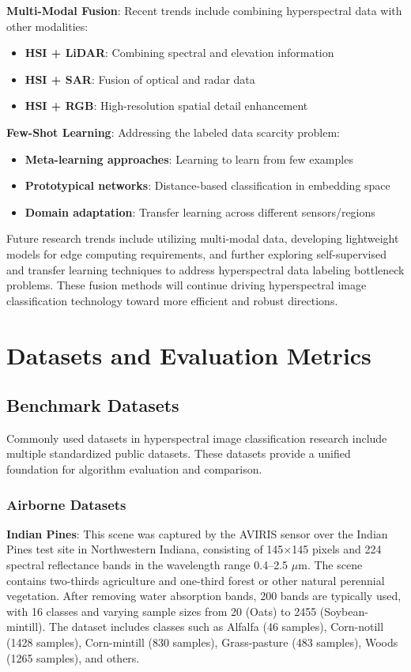 \documentclass[journal]{IEEEtran}
\begin{document}
\textbf{Multi-Modal Fusion}: Recent trends include combining hyperspectral data with other modalities:
\begin{itemize}
\item \textbf{HSI + LiDAR}: Combining spectral and elevation information
\item \textbf{HSI + SAR}: Fusion of optical and radar data
\item \textbf{HSI + RGB}: High-resolution spatial detail enhancement
\end{itemize}

\textbf{Few-Shot Learning}: Addressing the labeled data scarcity problem:
\begin{itemize}
\item \textbf{Meta-learning approaches}: Learning to learn from few examples
\item \textbf{Prototypical networks}: Distance-based classification in embedding space
\item \textbf{Domain adaptation}: Transfer learning across different sensors/regions
\end{itemize}

Future research trends include utilizing multi-modal data, developing lightweight models for edge computing requirements, and further exploring self-supervised and transfer learning techniques to address hyperspectral data labeling bottleneck problems. These fusion methods will continue driving hyperspectral image classification technology toward more efficient and robust directions.

\section{Datasets and Evaluation Metrics}

\subsection{Benchmark Datasets}

Commonly used datasets in hyperspectral image classification research include multiple standardized public datasets. These datasets provide a unified foundation for algorithm evaluation and comparison.

\subsubsection{Airborne Datasets}

\textbf{Indian Pines}: This scene was captured by the AVIRIS sensor over the Indian Pines test site in Northwestern Indiana, consisting of 145$\times$145 pixels and 224 spectral reflectance bands in the wavelength range 0.4--2.5 $\mu$m. The scene contains two-thirds agriculture and one-third forest or other natural perennial vegetation. After removing water absorption bands, 200 bands are typically used, with 16 classes and varying sample sizes from 20 (Oats) to 2455 (Soybean-mintill). The dataset includes classes such as Alfalfa (46 samples), Corn-notill (1428 samples), Corn-mintill (830 samples), Grass-pasture (483 samples), Woods (1265 samples), and others.
\end{document}
